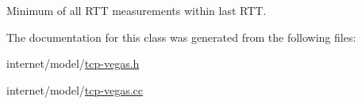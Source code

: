 Minimum of all R\+TT measurements within last R\+TT. 



The documentation for this class was generated from the following files\+:\begin{DoxyCompactItemize}
\item 
internet/model/\hyperlink{tcp-vegas_8h}{tcp-\/vegas.\+h}\item 
internet/model/\hyperlink{tcp-vegas_8cc}{tcp-\/vegas.\+cc}\end{DoxyCompactItemize}
